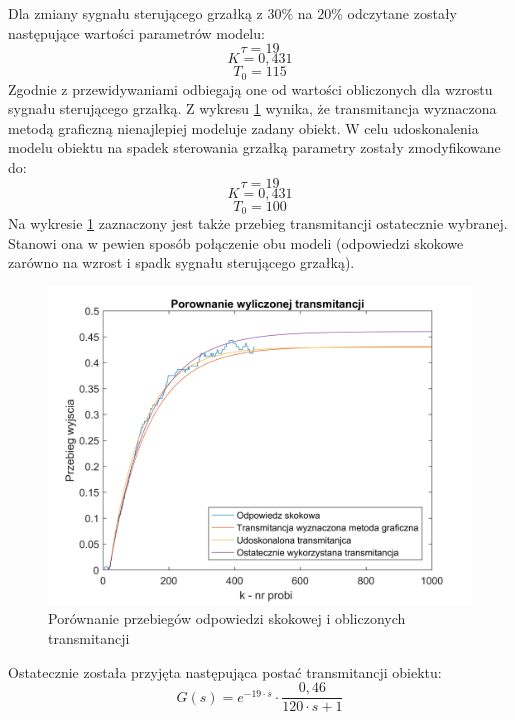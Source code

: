 \documentclass[12pt, a4paper]{article}
\begin{document}
Dla zmiany sygnału sterującego grzałką z $30\%$ na $20\%$ odczytane zostały następujące wartości parametrów modelu:
\[\tau=19\]
\[K=0,431\]
\[T_{0}=115\]
Zgodnie z przewidywaniami odbiegają one od wartości obliczonych dla wzrostu sygnału sterującego grzałką. Z wykresu \ref{fig:transmi_gd} wynika, że transmitancja wyznaczona metodą graficzną nienajlepiej modeluje zadany obiekt. W celu udoskonalenia modelu obiektu na spadek sterowania grzałką parametry zostały zmodyfikowane do:
\[\tau=19\]
\[K=0,431\]
\[T_{0}=100\]
Na wykresie \ref{fig:transmi_gd} zaznaczony jest także przebieg transmitancji ostatecznie wybranej. Stanowi ona w pewien sposób połączenie obu modeli (odpowiedzi skokowe zarówno na wzrost i spadk sygnału sterującego grzałką).
\begin{figure}[H]
	\centering
	\includegraphics[width=0.9\linewidth]{transmi_gd}
	\caption{Porównanie przebiegów odpowiedzi skokowej i obliczonych transmitancji}
	\label{fig:transmi_gd}
\end{figure}
Ostatecznie została przyjęta następująca postać transmitancji obiektu:
\[G(s)=e^{-19 \cdot s} \cdot \frac{0,46}{120 \cdot s +1}\]
\end{document}
